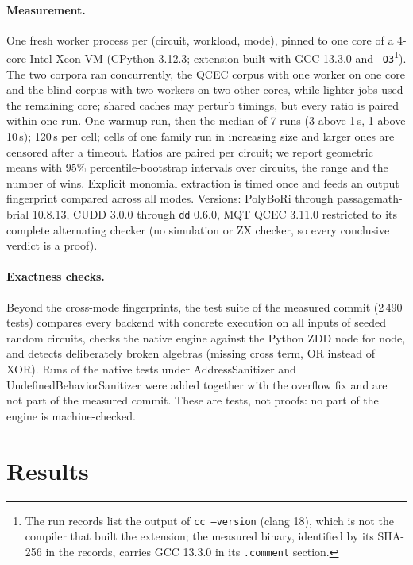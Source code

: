\documentclass[10pt,a4paper]{article}
\theoremstyle{definition}
\begin{document}
\paragraph{Measurement.} One fresh worker process per (circuit, workload, mode), pinned to
one core of a 4-core Intel Xeon VM (CPython 3.12.3; extension built with GCC 13.3.0 and
\texttt{-O3}\footnote{The run records list the output of \texttt{cc --version} (clang 18),
which is not the compiler that built the extension; the measured binary, identified by its
SHA-256 in the records, carries GCC 13.3.0 in its \texttt{.comment} section.}). The two
corpora ran concurrently, the QCEC corpus with one worker on one core and the blind corpus
with two workers on two other cores, while lighter jobs used the remaining core; shared
caches may perturb timings, but every ratio is paired within one run. One warmup run,
then the median of 7 runs (3 above 1\,s, 1 above 10\,s); 120\,s per cell; cells of one family
run in increasing size and larger ones are censored after a timeout. Ratios are paired per
circuit; we report geometric means with 95\% percentile-bootstrap intervals over circuits,
the range and the number of wins. Explicit monomial extraction is timed once and feeds an
output fingerprint compared across all modes. Versions: PolyBoRi through passagemath-brial
10.8.13, CUDD 3.0.0 through \texttt{dd} 0.6.0, MQT QCEC 3.11.0 restricted to its complete
alternating checker (no simulation or ZX checker, so every conclusive verdict is a proof).

\paragraph{Exactness checks.} Beyond the cross-mode fingerprints, the test suite of the
measured commit (2\,490 tests) compares every backend with concrete execution on all inputs
of seeded random circuits, checks the native engine against the Python ZDD node for node, and
detects deliberately broken algebras (missing cross term, OR instead of XOR). Runs of the
native tests under AddressSanitizer and UndefinedBehaviorSanitizer were added together with
the overflow fix and are not part of the measured commit. These are tests, not proofs: no
part of the engine is machine-checked.

\section{Results}\label{sec:results}



\end{document}
